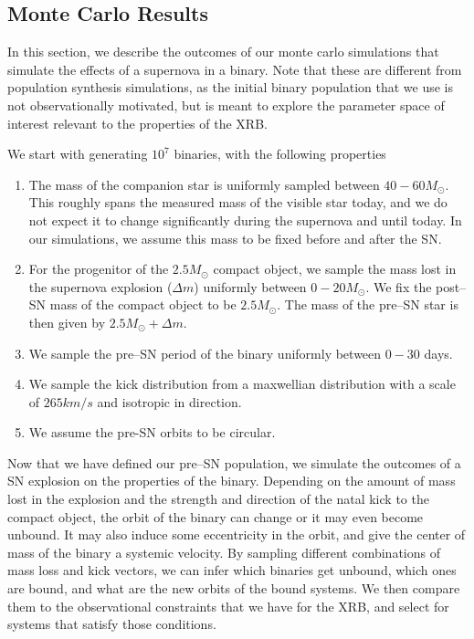 \documentclass[linenumbers,trackchanges,twocolumn]{aastex701}
\begin{document}
\subsection{Monte Carlo Results}

In this section, we describe the outcomes of our monte carlo simulations that simulate the effects of a supernova in a binary. Note that these are different from population synthesis simulations, as the initial binary population that we use is not observationally motivated, but is meant to explore the parameter space of interest relevant to the properties of the XRB. 

We start with generating $10^7$ binaries, with the following properties
 
\begin{enumerate}
        \item The mass of the companion star is uniformly sampled between $40-60M_{\odot}$. This roughly spans the measured mass of the visible star today, and we do not expect it to change significantly during the supernova and until today. In our simulations, we assume this mass to be fixed before and after the SN.
        \item For the progenitor of the $2.5M_{\odot}$ compact object, we sample the mass lost in the supernova explosion ($\Delta m$) uniformly between $0-20M_{\odot}$. We fix the post--SN mass of the compact object to be $2.5M_{\odot}$. The mass of the pre--SN star is then given by $2.5M_{\odot}+\Delta m$.
        \item We sample the pre--SN period of the binary uniformly between $0-30$ days.
        \item We sample the kick distribution from a maxwellian distribution with a scale of $265 km/s$ and isotropic in direction.
        \item We assume the pre-SN orbits to be circular.
\end{enumerate}

Now that we have defined our pre--SN population, we simulate the outcomes of a SN explosion on the properties of the binary. Depending on the amount of mass lost in the explosion and the strength and direction of the natal kick to the compact object, the orbit of the binary can change or it may even become unbound. It may also induce some eccentricity in the orbit, and give the center of mass of the binary a systemic velocity. By sampling different combinations of mass loss and kick vectors, we can infer which binaries get unbound, which ones are bound, and what are the new orbits of the bound systems. We then compare them to the observational constraints that we have for the XRB, and select for systems that satisfy those conditions.
\end{document}
